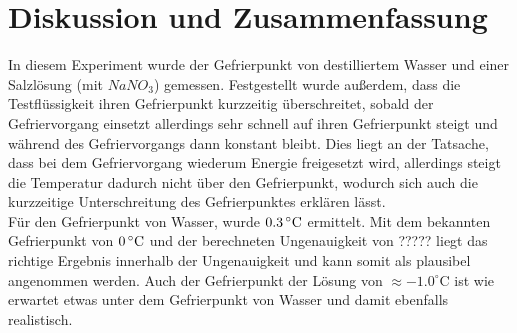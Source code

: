 \section{Diskussion und Zusammenfassung}
In diesem Experiment wurde der Gefrierpunkt von destilliertem Wasser und einer Salzlösung (mit $NaNO_3$) gemessen. Festgestellt wurde außerdem, dass die Testflüssigkeit ihren Gefrierpunkt kurzzeitig überschreitet, sobald der Gefriervorgang einsetzt allerdings sehr schnell auf ihren Gefrierpunkt steigt und während des Gefriervorgangs dann konstant bleibt. Dies liegt an der Tatsache, dass bei dem Gefriervorgang wiederum Energie freigesetzt wird, allerdings steigt die Temperatur dadurch nicht über den Gefrierpunkt, wodurch sich auch die kurzzeitige Unterschreitung des Gefrierpunktes erklären lässt.\\
Für den Gefrierpunkt von Wasser, wurde $\unit[0.3]{ ^\circ C}$ ermittelt. Mit dem bekannten Gefrierpunkt von $\unit[0]{ ^\circ C}$ und der berechneten Ungenauigkeit von ????? liegt das richtige Ergebnis innerhalb der Ungenauigkeit und kann somit als plausibel angenommen werden. Auch der Gefrierpunkt der Lösung von $\approx -1.0^\circ$C ist wie erwartet etwas unter dem Gefrierpunkt von Wasser und damit ebenfalls realistisch.







